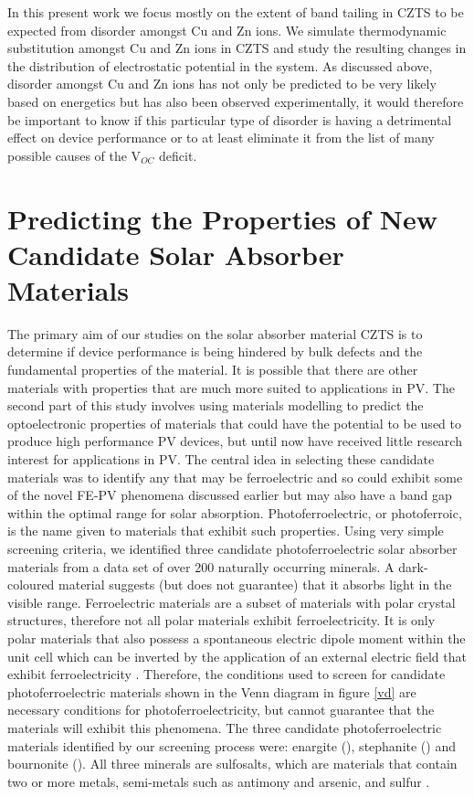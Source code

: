 In this present work we focus mostly on the extent of band tailing in CZTS to be expected from disorder amongst Cu and Zn ions. We simulate thermodynamic substitution amongst Cu and Zn ions in CZTS and study the resulting changes in the distribution of electrostatic potential in the system.
As discussed above, disorder amongst Cu and Zn ions has not only be predicted to be very likely based on energetics but has also been observed experimentally, it would therefore be important to know if this particular type of disorder is having a detrimental effect on device performance or to at least eliminate it from the list of many possible causes of the V$_{OC}$ deficit.
 


\section{Predicting the Properties of New Candidate Solar Absorber Materials}\label{sulfosalts_intro}
The primary aim of our studies on the solar absorber material CZTS is to determine if device performance is being hindered by bulk defects and the fundamental properties of the material. It is possible that there are other materials with properties that are much more suited to applications in PV.
The second part of this study involves using materials modelling to predict the optoelectronic properties of materials that could have the potential to be used to produce high performance PV devices, but until now have received little research interest for applications in PV.  The central idea in selecting these candidate materials was to identify any that may be ferroelectric and so could exhibit some of the novel FE-PV phenomena discussed earlier but may also have a band gap within the optimal range for solar absorption. Photoferroelectric, or photoferroic, is the name given to materials that exhibit such properties. 
Using very simple screening criteria, we identified three candidate photoferroelectric solar absorber materials from a data set of over 200 naturally occurring minerals. 
A dark-coloured material suggests (but does not guarantee) that it absorbs light in the visible range. Ferroelectric materials are a subset of materials with polar crystal structures, therefore not all polar materials exhibit ferroelectricity. It is only polar materials that also possess a spontaneous electric dipole moment within the unit cell which can be inverted by the application of an external electric field that exhibit ferroelectricity \cite{FE_subset}. 
Therefore, the conditions used to screen for candidate photoferroelectric materials shown in the Venn diagram in figure \ref{vd} are necessary conditions for photoferroelectricity, but cannot guarantee that the materials will exhibit this phenomena.
The three candidate photoferroelectric materials identified by our screening process were: enargite (\enargite), stephanite (\stephanite) and bournonite (\bournonite). All three minerals are sulfosalts, which are materials that contain two or more metals, semi-metals such as antimony and arsenic, and sulfur \cite{DK}. 

